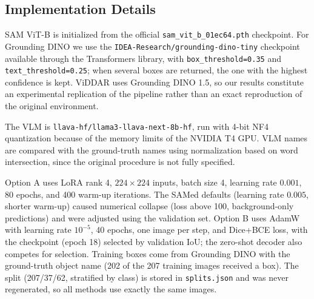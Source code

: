\documentclass[conference]{IEEEtran}
\begin{document}
\subsection{Implementation Details}

SAM ViT-B is initialized from the official \texttt{sam\_vit\_b\_01ec64.pth} checkpoint. For Grounding DINO we use the \texttt{IDEA-Research/grounding-dino-tiny} checkpoint available through the Transformers library, with \texttt{box\_threshold=0.35} and \texttt{text\_threshold=0.25}; when several boxes are returned, the one with the highest confidence is kept. ViDDAR uses Grounding DINO 1.5, so our results constitute an experimental replication of the pipeline rather than an exact reproduction of the original environment.

The VLM is \texttt{llava-hf/llama3-llava-next-8b-hf}, run with 4-bit NF4 quantization because of the memory limits of the NVIDIA T4 GPU. VLM names are compared with the ground-truth names using normalization based on word intersection, since the original procedure is not fully specified.

Option A uses LoRA rank 4, $224\times224$ inputs, batch size 4, learning rate $0.001$, 80 epochs, and 400 warm-up iterations. The SAMed defaults (learning rate $0.005$, shorter warm-up) caused numerical collapse (loss above 100, background-only predictions) and were adjusted using the validation set. Option B uses AdamW with learning rate $10^{-5}$, 40 epochs, one image per step, and Dice+BCE loss, with the checkpoint (epoch 18) selected by validation IoU; the zero-shot decoder also competes for selection. Training boxes come from Grounding DINO with the ground-truth object name (202 of the 207 training images received a box). The split (207/37/62, stratified by class) is stored in \texttt{splits.json} and was never regenerated, so all methods use exactly the same images.





\end{document}
